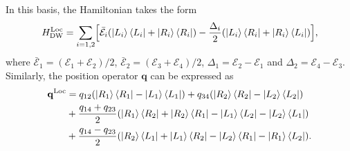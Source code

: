 \documentclass[11pt]{article}
\begin{document}
%
In this basis, the Hamiltonian takes the form 
%
\begin{equation}
    H_{\text{DW}}^{\text{Loc}}=\sum_{i=1,2} \Bigl[ \bar{\mathcal{E}}_i ( \ket{L_i}\bra{L_i}+\ket{R_i}\bra{R_i} )
    - \frac{\Delta_i}{2} (\ket{L_i}\bra{R_i}+\ket{R_i}\bra{L_i}) \Bigr],
\end{equation}
%
where $\bar{\mathcal{E}}_1=(\mathcal{E}_1+\mathcal{E}_2)/2$, $\bar{\mathcal{E}}_2=(\mathcal{E}_3+\mathcal{E}_4)/2$, 
$\Delta_1=\mathcal{E}_2-\mathcal{E}_1$ and $\Delta_2=\mathcal{E}_4-\mathcal{E}_3$.
Similarly, the position operator $\mathbf{q}$ can be expressed as
%
\begin{equation}
\begin{split}
    \mathbf{q}^{\text{Loc}} &= q_{12}(\ket{R_1}\bra{R_1}-\ket{L_1}\bra{L_1})+q_{34}(\ket{R_2}\bra{R_2}-\ket{L_2}\bra{L_2}) \\
    &+ \frac{q_{14}+q_{23}}{2}(\ket{R_1}\bra{R_2}+\ket{R_2}\bra{R_1}-\ket{L_1}\bra{L_2}-\ket{L_2}\bra{L_1}) \\
    &+ \frac{q_{14}-q_{23}}{2}(\ket{R_2}\bra{L_1}+\ket{L_1}\bra{R_2}-\ket{L_2}\bra{R_1}-\ket{R_1}\bra{L_2}).
\end{split}
\end{equation}
%
\end{document}
